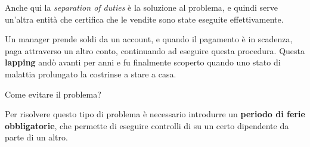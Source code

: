 \begin{Answer} [
  ref={fr2},
  number={2}
 ]

 \Question Anche qui la \textit{separation of duties} è la soluzione al
problema, e quindi serve un'altra entità che certifica che le vendite sono
state eseguite effettivamente.

\end{Answer}


\begin{Exercise} [
  title={Caso di Lepping},
  difficulty={1},
  label={fr3}
 ]

 Un manager prende soldi da un account, e quando il pagamento è in scadenza,
paga attraverso un altro conto, continuando ad eseguire questa procedura.
Questa \textbf{lapping} andò avanti per anni e fu finalmente scoperto quando uno
stato di malattia prolungato la costrinse a stare a casa.

  \Question Come evitare il problema?
\end{Exercise}

\begin{Answer} [
  ref={fr3},
  number={3}
 ]

 \Question Per risolvere questo tipo di problema è necessario introdurre un
\textbf{periodo di ferie obbligatorie}, che permette di eseguire controlli di
su un certo dipendente da parte di un altro.

\end{Answer}

